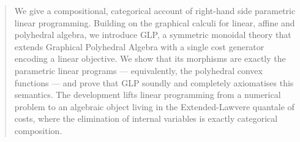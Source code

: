 
\begin{abstract}
We give a compositional, categorical account of right-hand side parametric
linear programming. Building on the graphical calculi for linear, affine and
polyhedral algebra, we introduce GLP, a symmetric monoidal theory
that extends Graphical Polyhedral Algebra with a single cost generator
encoding a linear objective. We show that its morphisms are exactly the
parametric linear programs --- equivalently, the polyhedral convex functions ---
and prove that GLP soundly and completely axiomatises this semantics. The
development lifts linear programming from a numerical problem to an algebraic
object living in the Extended-Lawvere quantale of costs, where the elimination
of internal variables is exactly categorical composition.

\end{abstract}
